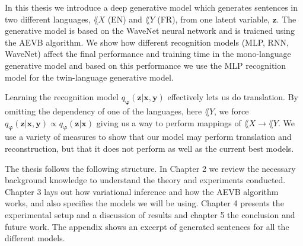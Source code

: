 
In this thesis we introduce a deep generative model which generates sentences in two
different languages, $\lang{X}$ (EN) and $\lang{Y}$ (FR), from one latent
variable, $\bm{z}$. The generative model is based on the WaveNet neural network
\cite{DBLP:journals/corr/OordDZSVGKSK16} and is traicned using the AEVB
algorithm. We show how different recognition models (MLP, RNN, WaveNet) affect
the final performance and training time in the mono-language generative model and based on this
performance we use the MLP recognition model for the twin-language generative model.

Learning the recognition model $q_{\bm{\varphi}}(\bm{z} | \bm{x}, \bm{y})$
effectively lets us do translation. By omitting the dependency of one of the
languages, here $\lang{Y}$, we force $q_{\bm{\varphi}}(\bm{z} | \bm{x}, \bm{y})
\propto q_{\bm{\varphi}}(\bm{z} | \bm{x})$ giving us a way to perform mappings of $\lang{X} \to
\lang{Y}$. We use a variety of measures to show that our model may perform
translation and reconstruction, but that it does not perform as well as the
current best models.


The thesis follows the following structure. In Chapter 2 we review the necessary
background knowledge to understand the theory and experiments conducted. Chapter
3 lays out how variational inference and how the AEVB algorithm works,
and also specifies the models we will be using. Chapter 4 presents the
experimental setup and a discussion of results and chapter 5 the conclusion and future work. The
appendix shows an excerpt of generated sentences for all the different models.